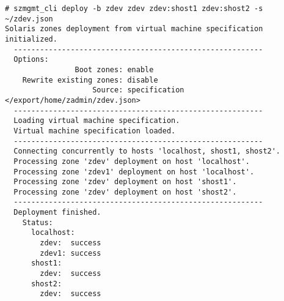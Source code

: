 \begin{lstlisting}[basicstyle=\scriptsize\ttfamily, caption={Vytvoření neglobálních zón ze šablony}, float,label={code:test:deployment}]  
# szmgmt_cli deploy -b zdev zdev zdev:shost1 zdev:shost2 -s ~/zdev.json 
Solaris zones deployment from virtual machine specification initialized.
  ---------------------------------------------------------
  Options:
                Boot zones: enable
    Rewrite existing zones: disable
                    Source: specification </export/home/zadmin/zdev.json>
  ---------------------------------------------------------
  Loading virtual machine specification.
  Virtual machine specification loaded.
  ---------------------------------------------------------
  Connecting concurrently to hosts 'localhost, shost1, shost2'.
  Processing zone 'zdev' deployment on host 'localhost'.
  Processing zone 'zdev1' deployment on host 'localhost'.
  Processing zone 'zdev' deployment on host 'shost1'.
  Processing zone 'zdev' deployment on host 'shost2'.
  ---------------------------------------------------------
  Deployment finished.
    Status:
      localhost:
        zdev:  success
        zdev1: success
      shost1:
        zdev:  success
      shost2:
        zdev:  success
\end{lstlisting}

